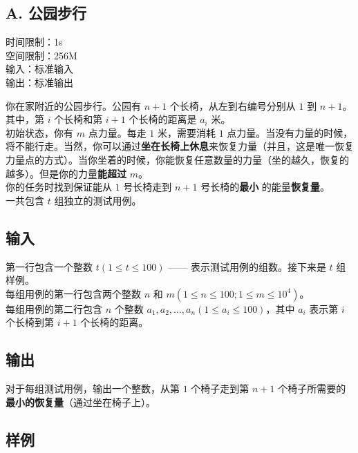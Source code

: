 \documentclass{article}
\begin{document}
\setlength{\parindent}{0pt}
\begin{CJK}{UTF8}{gbsn}
\begin{center}
\section*{A. 公园步行}
时间限制：1s\\
空间限制：256M\\
输入：标准输入\\
输出：标准输出
\end{center}
你在家附近的公园步行。公园有 $n+1$ 个长椅，从左到右编号分别从 $1$ 到 $n+1$。其中，第 $i$ 个长椅和第 $i+1$ 个长椅的距离是 $a_i$ 米。\\

初始状态，你有 $m$ 点力量。每走 $1$ 米，需要消耗 $1$ 点力量。当没有力量的时候，将不能行走。当然，你可以通过\textbf{坐在长椅上休息}来恢复力量（并且，这是唯一恢复力量点的方式）。当你坐着的时候，你能恢复任意数量的力量（坐的越久，恢复的越多）。但是你的力量\textbf{能超过} $m$。\\

你的任务时找到保证能从 $1$ 号长椅走到 $n+1$ 号长椅的\textbf{最小} 的能量\textbf{恢复量}。\\

一共包含 $t$ 组独立的测试用例。

\subsection*{输入}

第一行包含一个整数 $t(1\leq t \leq 100)$ —— 表示测试用例的组数。接下来是 $t$ 组样例。\\

每组用例的第一行包含两个整数 $n$ 和 $m(1\leq n \leq 100; 1\leq m \leq 10^4)$。\\

每组用例的第二行包含 $n$ 个整数 $a_1, a_2, \dots, a_n(1\leq a_i \leq 100)$，其中 $a_i$ 表示第 $i$ 个长椅到第 $i+1$ 个长椅的距离。

\subsection*{输出}

对于每组测试用例，输出一个整数，从第 $1$ 个椅子走到第 $n+1$ 个椅子所需要的 \textbf{最小的恢复量}（通过坐在椅子上）。

\subsection*{样例}


\end{CJK}
\end{document}
